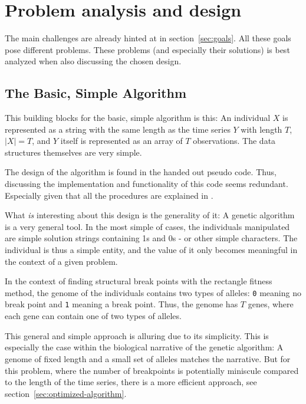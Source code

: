 
\section{Problem analysis and design} \label{sec:analysis-design} 

The main challenges are already hinted at in section~\ref{sec:goals}. All these
goals pose different problems. These problems (and especially their solutions)
is best analyzed when also discussing the chosen design.



\subsection{The Basic, Simple Algorithm} \label{sec:basic-algorithm}

This building blocks for the basic, simple algorithm is this: An individual $X$
is represented as a string with the same length as the time series $Y$ with
length $T$, $|X| = T$, and $Y$ itself is represented as an array of $T$
observations. The data structures themselves are very simple. 

The design of the algorithm is found in the handed out pseudo code. Thus,
discussing the implementation and functionality of this code seems redundant.
Especially given that all the procedures are explained in \cite{doerr2017a}. 

What \textit{is} interesting about this design is the generality of it: A
genetic algorithm is a very general tool. In the most simple of cases, the
individuals manipulated are simple solution strings containing 1s and 0s - or
other simple characters. The individual is thus a simple entity, and the value
of it only becomes meaningful in the context of a given problem.

In the context of finding structural break points with the rectangle fitness
method, the genome of the individuals contains two types of alleles: \texttt{0}
meaning no break point and \texttt{1} meaning a break point. Thus, the genome
has $T$ genes, where each gene can contain one of two types of alleles. 

This general and simple approach is alluring due to its simplicity. This is
especially the case within the biological narrative of the genetic algorithm: A
genome of fixed length and a small set of alleles matches the narrative. But for
this problem, where the number of breakpoints is potentially miniscule compared
to the length of the time series, there is a more efficient approach, see
section~\ref{sec:optimized-algorithm}. 



